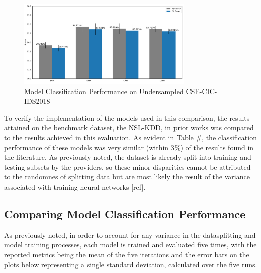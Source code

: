 \documentclass[conference]{IEEEtran}
\begin{document}
\begin{figure}[htpb]
  \centering
  \includegraphics[width=0.75\textwidth]{images/acc_f1_cic.pdf}
  \caption{Model Classification Performance on Undersampled CSE-CIC-IDS2018}
  \label{fig:acc_f1_cic}
\end{figure}


To verify the implementation of the models used in this comparison, the results attained on the benchmark dataset, the NSL-KDD, in prior works was compared to the results achieved in this evaluation. As evident in Table #, the classification performance of these models was very similar (within 3\%) of the results found in the literature. As previously noted, the dataset is already split into training and testing subsets by the providers, so these minor disparities cannot be attributed to the randomnes of splitting data but are most likely the result of the variance associated with training neural networks [ref]. 




\subsection{Comparing Model Classification Performance}
As previously noted, in order to account for any variance in the datasplitting and model training processes, each model is trained and evaluated five times, with the reported metrics being the mean of the five iterations and the error bars on the plots below representing a single standard deviation, calculated over the five runs. 
\end{document}
